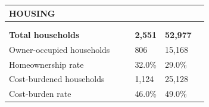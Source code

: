 \documentclass[9pt]{report}
\begin{document}
\vspace{12pt}
\setlength{\tabcolsep}{.01in} %
\begin{tabular}{p{.10in}p{.10in}p{.10in}p{3.7in}>{\hfill}p{.85in}>{\hfill}p{.85in}>{\hfill}p{.85in}>{\hfill}p{.85in}p{0.1in}}
\multicolumn{9}{l}{\parbox{7.1in}{\raggedright{\large{\strut\textbf{HOUSING}\strut}}}} \\ 
\hline
\multicolumn{4}{l}{\parbox{3.5in}{\raggedright{\textbf{}}}} & \multicolumn{1}{r}{\parbox{.85in}{\strut\raggedleft{\textbf{}\strut}}} & \multicolumn{1}{r}{\parbox{.85in}{\strut\raggedleft{\textbf{}\strut}}} & \multicolumn{1}{r}{\parbox{.85in}{\strut{}}} & \multicolumn{1}{r}{\parbox{.85in}{\strut{}}} & \\ 
\multicolumn{9}{l}{} \\ 
\multicolumn{4}{l}{\parbox{3.5in}{\strut\raggedright{\textbf{Total households}\strut}}} & \textbf{} & \textbf{} & \textbf{2,551} & \textbf{52,977} & \textbf{} \\ 
\multicolumn{4}{l}{\parbox{3.6in}{\strut\raggedright{{Owner-occupied households}}\strut}} &  &  & 806 & 15,168 & \multicolumn{1}{l}{}  \\ 
\multicolumn{4}{l}{\parbox{3.6in}{\strut\raggedright{{Homeownership rate}}\strut}} &  &  & 32.0\% & 29.0\% & \multicolumn{1}{l}{}  \\ 
\multicolumn{4}{l}{\parbox{3.6in}{\strut\raggedright{{Cost-burdened households}}\strut}} &  &  & 1,124 & 25,128 & \multicolumn{1}{l}{}  \\ 
\multicolumn{4}{l}{\parbox{3.6in}{\strut\raggedright{{Cost-burden rate}}\strut}} &  &  & 46.0\% & 49.0\% & \multicolumn{1}{l}{}  \\ 

\end{tabular}
\setlength{\tabcolsep}{6pt} %
\end{document}
